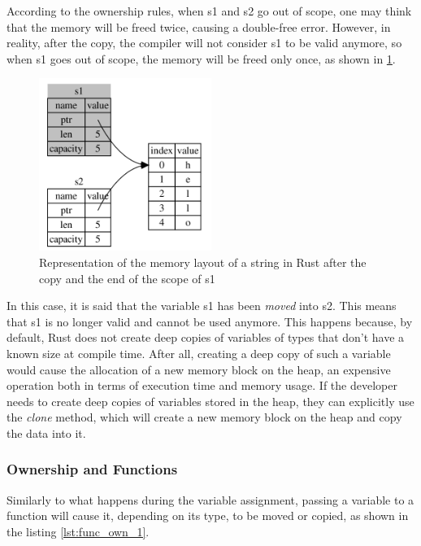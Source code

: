 According to the ownership rules, when s1 and s2 go out of scope, one may think that the memory will be freed twice, causing a double-free error. However, in reality, after the copy, the compiler
will not consider s1 to be valid anymore, so when s1 goes out of scope, the memory will be freed only once, as shown in \cref{fig:string-memory-rep3}.

\begin{figure}[h]
    \centering
    \includegraphics[width=0.5\textwidth]{figures/string-memory-rep-3.png}
    \caption{Representation of the memory layout of a string in Rust after the copy and the end of the scope of s1}
    \label{fig:string-memory-rep3}
\end{figure}

In this case, it is said that the variable s1 has been \textit{moved} into s2. This means that s1 is no longer valid and cannot be used anymore.
This happens because, by default, Rust does not create deep copies of variables of types that don't have a known size at compile time. After all, creating a deep copy of such
a variable would cause the allocation of a new memory block on the heap, an expensive operation both in terms of execution time and memory usage. If the developer
needs to create deep copies of variables stored in the heap, they can explicitly use the \textit{clone} method, which will create a new memory block on the heap and copy the data into it.

\subsubsection{Ownership and Functions}
Similarly to what happens during the variable assignment, passing a variable to a function will cause it, depending on its type, to be moved or copied, as shown in the listing \ref{lst:func_own_1}.



